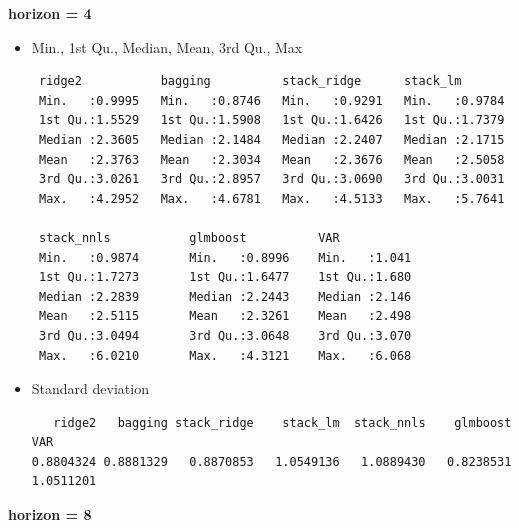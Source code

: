 \textbf{horizon = 4}

\begin{itemize}

\item Min., 1st Qu., Median, Mean, 3rd Qu., Max

\begin{verbatim}
 ridge2           bagging          stack_ridge      stack_lm         
 Min.   :0.9995   Min.   :0.8746   Min.   :0.9291   Min.   :0.9784   
 1st Qu.:1.5529   1st Qu.:1.5908   1st Qu.:1.6426   1st Qu.:1.7379   
 Median :2.3605   Median :2.1484   Median :2.2407   Median :2.1715      
 Mean   :2.3763   Mean   :2.3034   Mean   :2.3676   Mean   :2.5058      
 3rd Qu.:3.0261   3rd Qu.:2.8957   3rd Qu.:3.0690   3rd Qu.:3.0031      
 Max.   :4.2952   Max.   :4.6781   Max.   :4.5133   Max.   :5.7641
 
 stack_nnls           glmboost          VAR
 Min.   :0.9874       Min.   :0.8996    Min.   :1.041 
 1st Qu.:1.7273       1st Qu.:1.6477    1st Qu.:1.680
 Median :2.2839       Median :2.2443    Median :2.146
 Mean   :2.5115       Mean   :2.3261    Mean   :2.498
 3rd Qu.:3.0494       3rd Qu.:3.0648    3rd Qu.:3.070
 Max.   :6.0210       Max.   :4.3121    Max.   :6.068
\end{verbatim}

\item Standard deviation

\begin{verbatim}
   ridge2   bagging stack_ridge    stack_lm  stack_nnls    glmboost   VAR
0.8804324 0.8881329   0.8870853   1.0549136   1.0889430   0.8238531   1.0511201
\end{verbatim}

\end{itemize}

\textbf{horizon = 8}

